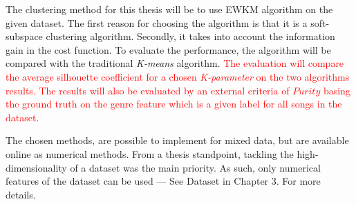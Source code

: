 \documentclass[../report.tex]{subfiles}
\begin{document}
The clustering method for this thesis will be to use EWKM algorithm on the given dataset. The first reason for choosing the algorithm is that it is a soft-subspace clustering algorithm. Secondly, it takes into account the information gain in the cost function. To evaluate the performance, the algorithm will be compared with the traditional \textit{K-means} algorithm. \textcolor{red}{
The evaluation will compare the average silhouette coefficient for a chosen \textit{K-parameter} on the two algorithms results. The results will also be evaluated by an external criteria of $Purity$ basing the ground truth on the genre feature which is a given label for all songs in the dataset.}

The chosen methods, are possible to implement for mixed data, but are available online as numerical methods. From a thesis standpoint, tackling the high-dimensionality of a dataset was the main priority. As such, only numerical features of the dataset can be used --- See Dataset in Chapter 3. For more details. %
\end{document}
